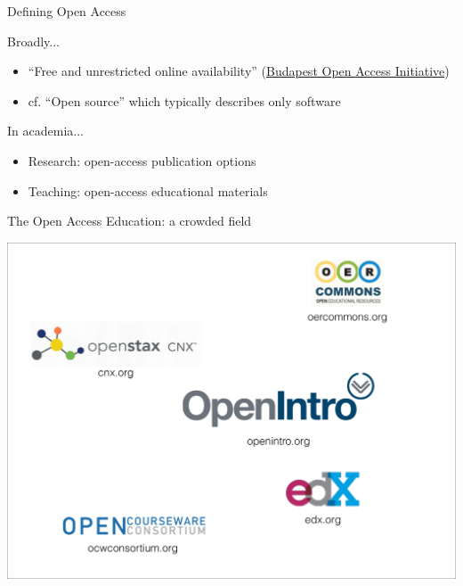 \begin{frame}{Defining Open Access}

\begin{block}{Broadly...}
\begin{itemize}
        \item ``Free and unrestricted online availability'' (\href{http://www.budapestopenaccessinitiative.org/read}{Budapest Open Access Initiative})
        \item cf. ``Open source'' which typically describes only software
\end{itemize}
\end{block}

\begin{block}{In academia...}
\begin{itemize}
        \item Research: open-access publication options
        \item Teaching: open-access educational materials
\end{itemize}
\end{block}

\end{frame}


\begin{frame}{The Open Access Education: a crowded field}

\includegraphics[width=\linewidth]{openEdLogos}

\end{frame}


